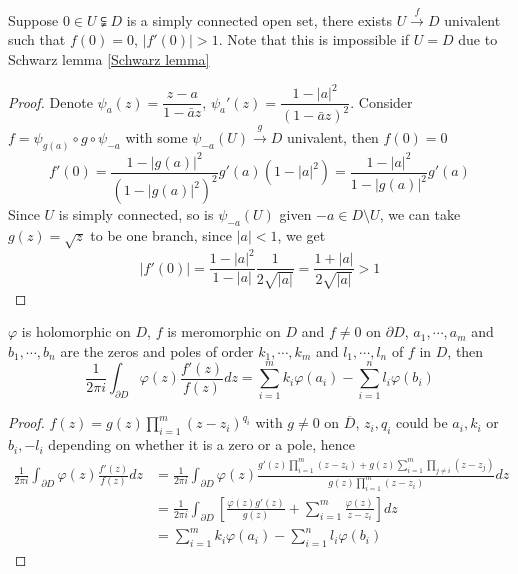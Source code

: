 \documentclass[main]{subfiles}
\begin{document}
\begin{lemma}\label{Lemma for Riemann mapping theorem}
Suppose $0\in U\subsetneqq D$ is a simply connected open set, there exists $U\xrightarrow fD$ univalent such that $f(0)=0$, $|f'(0)|>1$. Note that this is impossible if $U=D$ due to Schwarz lemma \ref{Schwarz lemma}
\end{lemma}

\begin{proof}
Denote $\psi_a(z)=\dfrac{z-a}{1-\bar az}$, $\psi_a'(z)=\dfrac{1-|a|^2}{(1-\bar az)^2}$. Consider $f=\psi_{g(a)}\circ g\circ\psi_{-a}$ with some $\psi_{-a}(U)\xrightarrow gD$ univalent, then $f(0)=0$
\[f'(0)=\frac{1-|g(a)|^2}{(1-|g(a)|^2)^2}g'(a)(1-|a|^2)=\frac{1-|a|^2}{1-|g(a)|^2}g'(a)\]
Since $U$ is simply connected, so is $\psi_{-a}(U)$ given $-a\in D\setminus U$, we can take $g(z)=\sqrt z$ to be one branch, since $|a|<1$, we get
\[|f'(0)|=\frac{1-|a|^2}{1-|a|}\frac{1}{2\sqrt{|a|}}=\frac{1+|a|}{2\sqrt{|a|}}>1\]
\end{proof}

\begin{lemma}\label{Lemma for finding zeros}
$\varphi$ is holomorphic on $D$, $f$ is meromorphic on $D$ and $f\neq0$ on $\partial D$, $a_1,\cdots,a_m$ and $b_1,\cdots,b_n$ are the zeros and poles of order $k_1,\cdots,k_m$ and $l_1,\cdots,l_n$ of $f$ in $D$, then
\[\displaystyle\frac{1}{2\pi i}\int_{\partial D}\varphi(z)\frac{f'(z)}{f(z)}dz=\sum_{i=1}^mk_i\varphi(a_i)-\sum_{i=1}^nl_i\varphi(b_i)\]
\end{lemma}

\begin{proof}
$\displaystyle f(z)=g(z)\prod_{i=1}^m(z-z_i)^{q_i}$ with $g\neq0$ on $\overline D$, $z_i,q_i$ could be $a_i,k_i$ or $b_i,-l_i$ depending on whether it is a zero or a pole, hence
\begin{align*}
\frac{1}{2\pi i}\int_{\partial D}\varphi(z)\frac{f'(z)}{f(z)}dz&=\frac{1}{2\pi i}\int_{\partial D}\varphi(z)\frac{g'(z)\prod_{i=1}^m(z-z_i)+g(z)\sum_{i=1}^m\prod_{j\neq i}(z-z_j)}{g(z)\prod_{i=1}^m(z-z_i)}dz \\
&=\frac{1}{2\pi i}\int_{\partial D}\left[\frac{\varphi(z)g'(z)}{g(z)}+\sum_{i=1}^m\frac{\varphi(z)}{z-z_i}\right]dz \\
&=\sum_{i=1}^mk_i\varphi(a_i)-\sum_{i=1}^nl_i\varphi(b_i)
\end{align*}
\end{proof}

\begin{theorem}\label{Rouche's theorem}

\end{theorem}
\end{document}
